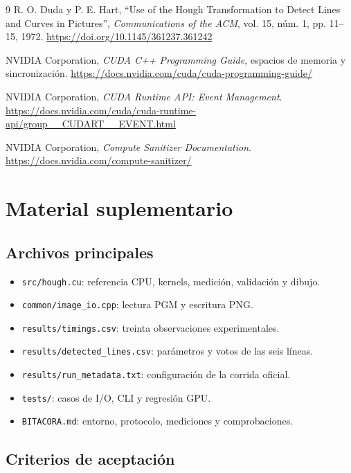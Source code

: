 \documentclass[12pt,letterpaper]{article}
\begin{document}
\begin{thebibliography}{9}
  R. O. Duda y P. E. Hart,
  ``Use of the Hough Transformation to Detect Lines and Curves in Pictures'',
  \emph{Communications of the ACM}, vol. 15, núm. 1, pp. 11--15, 1972.
  \url{https://doi.org/10.1145/361237.361242}

  NVIDIA Corporation,
  \emph{CUDA C++ Programming Guide}, espacios de memoria y sincronización.
  \url{https://docs.nvidia.com/cuda/cuda-programming-guide/}

  NVIDIA Corporation,
  \emph{CUDA Runtime API: Event Management}.
  \url{https://docs.nvidia.com/cuda/cuda-runtime-api/group__CUDART__EVENT.html}

  NVIDIA Corporation,
  \emph{Compute Sanitizer Documentation}.
  \url{https://docs.nvidia.com/compute-sanitizer/}
\end{thebibliography}

\appendix
\section{Material suplementario}

\subsection{Archivos principales}

\begin{itemize}
  \item \texttt{src/hough.cu}: referencia CPU, kernels, medición, validación y dibujo.
  \item \texttt{common/image\_io.cpp}: lectura PGM y escritura PNG.
  \item \texttt{results/timings.csv}: treinta observaciones experimentales.
  \item \texttt{results/detected\_lines.csv}: parámetros y votos de las seis líneas.
  \item \texttt{results/run\_metadata.txt}: configuración de la corrida oficial.
  \item \texttt{tests/}: casos de I/O, CLI y regresión GPU.
  \item \texttt{BITACORA.md}: entorno, protocolo, mediciones y comprobaciones.
\end{itemize}

\subsection{Criterios de aceptación}
\end{document}
